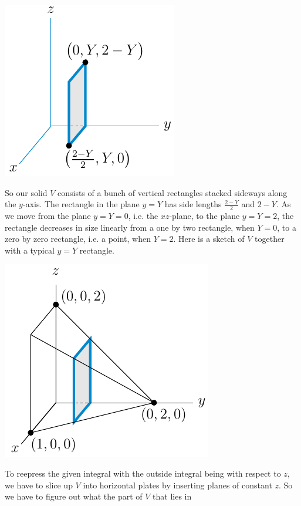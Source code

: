 \begin{eg}
\begin{efig}
\begin{center}
    \includegraphics{figures/integration/xchange5.pdf}
\end{center}
\end{efig}
So our solid $V$ consists of a bunch of vertical rectangles stacked sideways along the $y$-axis. The rectangle in the plane $y=Y$ has side lengths
$\frac{2-Y}{2}$ and $2-Y$. As we move from the plane $y=Y=0$, i.e. the $xz$-plane, to the plane $y=Y=2$, the rectangle decreases in size linearly 
from a one by two rectangle, when $Y=0$, to a zero by zero rectangle, 
i.e. a point, when $Y=2$.
Here is a sketch of $V$ together with a typical $y=Y$ rectangle.
\begin{efig}
\begin{center}
    \includegraphics{figures/integration/xchange4.pdf}
\end{center}
\end{efig}
To reepress the given integral with the outside integral being with respect to $z$, we have to slice up $V$ into horizontal plates by inserting planes 
of constant $z$. So we have to figure out what the part of $V$ that lies in 

\end{eg}
